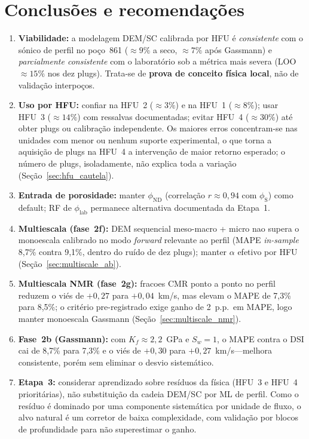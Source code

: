 \documentclass[11pt,a4paper]{article}
\numberwithin{equation}{section}
\newcommand{\philab}{\ensuremath{\phi_{\mathrm{lab}}}}
\newcommand{\phiND}{\ensuremath{\phi_{\mathrm{ND}}}}
\newcommand{\phiS}{\ensuremath{\phi_{\mathrm{S}}}}
\begin{document}
\section{Conclusões e recomendações}
\label{sec:conclusoes}

\begin{enumerate}
  \item \textbf{Viabilidade:} a modelagem DEM/SC calibrada por HFU é
        \emph{consistente} com o sónico de perfil no poço~861
        ($\approx 9\%$ a seco, $\approx 7\%$ após Gassmann) e
        \emph{parcialmente consistente} com o laboratório sob a métrica mais
        severa (LOO $\approx 15\%$ nos dez plugs).
        Trata-se de \textbf{prova de conceito física local}, não de
        validação interpoços.
  \item \textbf{Uso por HFU:} confiar na HFU~2 ($\approx 3\%$) e na HFU~1
        ($\approx 8\%$); usar HFU~3 ($\approx 14\%$) com ressalvas
        documentadas; evitar HFU~4 ($\approx 30\%$) até obter plugs ou
        calibração independente.
        Os maiores erros concentram-se nas unidades com menor ou nenhum
        suporte experimental, o que torna a aquisição de plugs na HFU~4 a
        intervenção de maior retorno esperado; o número de plugs,
        isoladamente, não explica toda a variação
        (Seção~\ref{sec:hfu_cautela}).
  \item \textbf{Entrada de porosidade:} manter \phiND{} (correlação
        $r \approx 0{,}94$ com \phiS{}) como default; RF de \philab{} permanece
        alternativa documentada da Etapa~1.
  \item \textbf{Multiescala (fase~2f):} DEM sequencial meso-macro + micro
        nao supera o monoescala calibrado no modo \emph{forward} relevante
        ao perfil (MAPE \emph{in-sample} 8,7\% contra 9,1\%, dentro do ruído
        de dez plugs); manter $\alpha$ efetivo por HFU
        (Seção~\ref{sec:multiscale_ab}).
  \item \textbf{Multiescala NMR (fase~2g):} fracoes CMR ponto a ponto no
        perfil reduzem o viés de $+0{,}27$ para $+0{,}04$~km/s, mas elevam o
        MAPE de 7,3\% para 8,5\%; o critério pre-registrado exige ganho de
        2~p.p.\ em MAPE, logo manter monoescala Gassmann
        (Seção~\ref{sec:multiscale_nmr}).
  \item \textbf{Fase~2b (Gassmann):} com $K_f \approx 2{,}2$~GPa e $S_w=1$, o
        MAPE contra o DSI cai de 8,7\% para 7,3\% e o viés de $+0{,}30$ para
        $+0{,}27$~km/s---melhora consistente, porém sem eliminar o desvio
        sistemático.
  \item \textbf{Etapa~3:} considerar aprendizado sobre resíduos da física
        (HFU~3 e HFU~4 prioritárias), não substituição da cadeia
        DEM/SC por ML de perfil.
        Como o resíduo é dominado por uma componente sistemática por unidade
        de fluxo, o alvo natural é um corretor de baixa complexidade, com
        validação por blocos de profundidade para não superestimar o ganho.
\end{enumerate}
\end{document}
